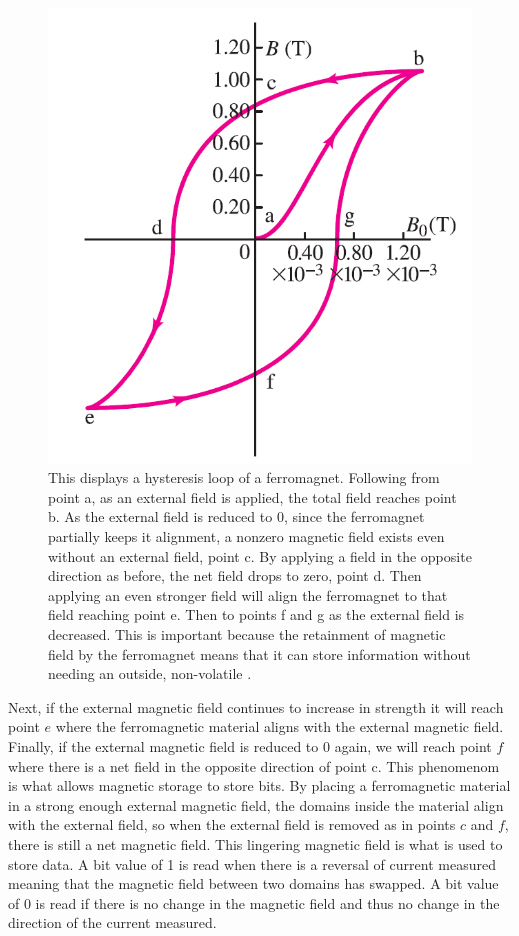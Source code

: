 \documentclass[ notitlepage, numerical, 11pt]{revtex4-1} %
\begin{document}
\begin{figure}[H]
\centerline{\includegraphics[scale=.4]{hysteresis.png}}
\caption{This displays a hysteresis loop of a ferromagnet. Following from point a, as an external field is applied, the total field reaches point b. As the external field is reduced to 0, since the ferromagnet partially keeps it alignment, a nonzero magnetic field exists even without an external field, point c. By applying a field in the opposite direction as before, the net field drops to zero, point d. Then applying an even stronger field will align the ferromagnet to that field reaching point e. Then to points f and g as the external field is decreased. This is important because the retainment of magnetic field by the ferromagnet means that it can store information without needing an outside, non-volatile \cite {modernPhysics}.}
\label{hysteresis}
\end{figure}
 Next, if the external magnetic field continues to increase in strength it will reach point $e$ where the ferromagnetic material aligns with the external magnetic field. Finally, if the external magnetic field is reduced to 0 again, we will reach point $f$ where there is a net field in the opposite direction of point c. This phenomenom is what allows magnetic storage to store bits. By placing a ferromagnetic material in a strong enough external magnetic field, the domains inside the material align with the external field, so when the external field is removed as in points $c$ and $f$, there is still a net magnetic field. This lingering magnetic field is what is used to store data. A bit value of 1 is read when there is a reversal of current measured meaning that the magnetic field between two domains has swapped. A bit value of 0 is read if there is no change in the magnetic field and thus no change in the direction of the current measured.
	
\end{document}
